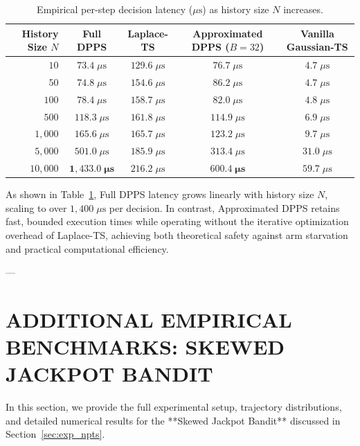 \documentclass[twoside]{article}
\begin{document}
\begin{table}[h]
\centering
\caption{Empirical per-step decision latency ($\mu\text{s}$) as history size $N$ increases.}
\label{tab:latency_benchmarks}
\small
\begin{tabular}{rcccc}
\toprule
\textbf{History Size $N$} & \textbf{Full DPPS} & \textbf{Laplace-TS} & \textbf{Approximated DPPS ($B=32$)} & \textbf{Vanilla Gaussian-TS} \\
\midrule
$10$ & $73.4 \; \mu\text{s}$ & $129.6 \; \mu\text{s}$ & $76.7 \; \mu\text{s}$ & $4.7 \; \mu\text{s}$ \\
$50$ & $74.8 \; \mu\text{s}$ & $154.6 \; \mu\text{s}$ & $86.2 \; \mu\text{s}$ & $4.7 \; \mu\text{s}$ \\
$100$ & $78.4 \; \mu\text{s}$ & $158.7 \; \mu\text{s}$ & $82.0 \; \mu\text{s}$ & $4.8 \; \mu\text{s}$ \\
$500$ & $118.3 \; \mu\text{s}$ & $161.8 \; \mu\text{s}$ & $114.9 \; \mu\text{s}$ & $6.9 \; \mu\text{s}$ \\
$1{,}000$ & $165.6 \; \mu\text{s}$ & $165.7 \; \mu\text{s}$ & $123.2 \; \mu\text{s}$ & $9.7 \; \mu\text{s}$ \\
$5{,}000$ & $501.0 \; \mu\text{s}$ & $185.9 \; \mu\text{s}$ & $313.4 \; \mu\text{s}$ & $31.0 \; \mu\text{s}$ \\
$10{,}000$ & $\mathbf{1{,}433.0 \; \mu\text{s}}$ & $216.2 \; \mu\text{s}$ & $\mathbf{600.4 \; \mu\text{s}}$ & $59.7 \; \mu\text{s}$ \\
\bottomrule
\end{tabular}
\end{table}

As shown in Table~\ref{tab:latency_benchmarks}, Full DPPS latency grows linearly with history size $N$, scaling to over $1{,}400 \; \mu\text{s}$ per decision. In contrast, Approximated DPPS retains fast, bounded execution times while operating without the iterative optimization overhead of Laplace-TS, achieving both theoretical safety against arm starvation and practical computational efficiency.

---

\section{ADDITIONAL EMPIRICAL BENCHMARKS: SKEWED JACKPOT BANDIT}
\label{app:additional_experiments}

In this section, we provide the full experimental setup, trajectory distributions, and detailed numerical results for the **Skewed Jackpot Bandit** discussed in Section~\ref{sec:exp_npts}.
\end{document}
